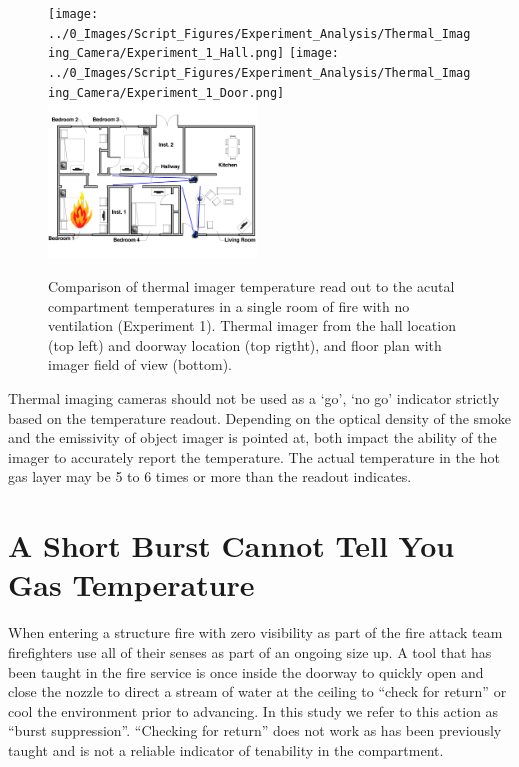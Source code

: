 \documentclass[12pt,oneside]{book}
\begin{document}
\begin{figure}[H]
\centering
\texttt{[image: ../0\_Images/Script\_Figures/Experiment\_Analysis/Thermal\_Imaging\_Camera/Experiment\_1\_Hall.png]}
\texttt{[image: ../0\_Images/Script\_Figures/Experiment\_Analysis/Thermal\_Imaging\_Camera/Experiment\_1\_Door.png]}
\includegraphics[width=0.495\textwidth]{../0_Images/Tactical_Considerations/Thermal_Imager/Imager_Location.png}
\caption[Thermal Imager Example]{Comparison of thermal imager temperature read out to the acutal compartment temperatures in a single room of fire with no ventilation (Experiment 1). Thermal imager from the hall location (top left) and doorway location (top rigtht), and floor plan with imager field of view (bottom).}
\label{fig:tc_thermal_imager_g}
\end{figure}

Thermal imaging cameras should not be used as a `go', `no go' indicator strictly based on the temperature readout. Depending on the optical density of the smoke and the emissivity of object imager is pointed at, both impact the ability of the imager to accurately report the temperature. The actual temperature in the hot gas layer may be 5 to 6 times or more than the readout indicates. 

\section{A Short Burst Cannot Tell You Gas Temperature} \label{tc:burst_suppression}
When entering a structure fire with zero visibility as part of the fire attack team firefighters use all of their senses as part of an ongoing size up.  A tool that has been taught in the fire service is once inside the doorway to quickly open and close the nozzle to direct a stream of water at the ceiling to ``check for return'' or cool the environment prior to advancing.   In this study we refer to this action as ``burst suppression''. ``Checking for return'' does not work as has been previously taught and is not a reliable indicator of tenability in the compartment. 
\end{document}
